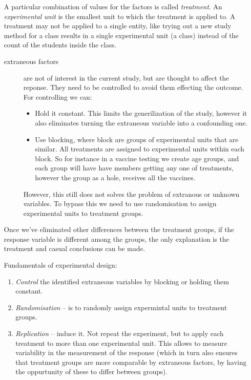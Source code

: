 A particular combination of values for the factors is called \emph{treatment}.
An \emph{experimental unit} is the smallest unit to which the treatment is
applied to. A treatment may not be applied to a single entity, like trying out a
new study method for a class results in a single experimental unit (a class)
instead of the count of the students inside the class.

\begin{description}
	\item[extraneous factors] are not of interest in the current study, but are
	      thought to affect the reponse. They need to be controlled to avoid them
	      effecting the outcome. For controlling we can:
	      \begin{itemize}
		      \item Hold it constant. This limits the generilization of the study, however
		            it also eliminates turning the extraneous variable into a confounding one.
		      \item Use blocking, where block are groups of experimental units that are
		            similar. All treatments are assigned to experimental units within each block.
		            So for instance in a vaccine testing we create age groups, and each group will
		            have have members getting any one of treatments, however the group as a hole,
		            receives all the vaccines.
	      \end{itemize}
	      However, this still does not solves the problem of extranous or unknown
	      variables. To bypass this we need to use randomisation to assign experimental
	      units to treatment groups.
\end{description}

Once we've eliminated other differences between the treatment groups, if the
response variable is different among the groups, the only explanation is the
treatment and casual conclusions can be made.

Fundamentals of experimental design:

\begin{enumerate}
	\item \emph{Control} the identified extraneous variables by blocking or
	      holding them constant.
	\item \emph{Randomisation} -- is to randomly assign expermintal units
	      to treatment groups.
	\item \emph{Replication} -- induce it. Not repeat the experiment, but to apply
	      each treatment to more than one experimental unit. This allows to measure
	      variability in the measurement of the response (which in turn also ensures
	      that treatment groups are more comparable by extraneous factors, by having
	      the oppurtunity of these to differ between groups).
\end{enumerate}

